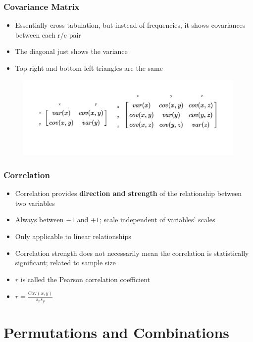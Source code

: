 \documentclass{article}
\begin{document}
\subsubsection{Covariance Matrix}

\begin{itemize}
    \item Essentially cross tabulation, but instead of frequencies, it shows covariances between each r/c pair
    \item The diagonal just shows the variance
    \item Top-right and bottom-left triangles are the same
\end{itemize}

\begin{figure}[H]
    \includegraphics[width=1\linewidth]{images/Covariance-Matrix.jpg}
\end{figure}

\subsubsection{Correlation}

\begin{itemize}
    \item Correlation provides \textbf{direction and strength} of the relationship between two variables
    \item Always between $-1$ and $+1$; scale independent of variables' scales
    \item Only applicable to linear relationships
    \item Correlation strength does not necessarily mean the correlation is statistically significant; related to sample size
    \item $r$ is called the Pearson correlation coefficient
    \item $r=\frac{\text{Cov}(x,y)}{s_xs_y}$
\end{itemize}

\section{Permutations and Combinations}
\end{document}
